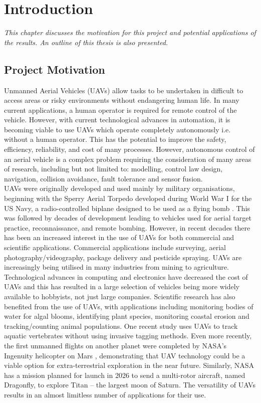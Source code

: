 
\chapter{Introduction}
\textit{This chapter discusses the motivation for this project and potential applications of the results. An outline of this thesis is also presented.}\\

\section{Project Motivation}
Unmanned Aerial Vehicles (UAVs) allow tasks to be undertaken in difficult to access areas or risky environments without endangering human life. In many current applications, a human operator is required for remote control of the vehicle. However, with current technological advances in automation, it is becoming viable to use UAVs which operate completely autonomously i.e. without a human operator. This has the potential to improve the safety, efficiency, reliability, and cost of many processes. However, autonomous control of an aerial vehicle is a complex problem requiring the consideration of many areas of research, including but not limited to: modelling, control law design, navigation, collision avoidance, fault tolerance and sensor fusion.\\

UAVs were originally developed and used mainly by military organisations, beginning with the Sperry Aerial Torpedo developed during World War I for the US Navy, a radio-controlled biplane designed to be used as a flying bomb \cite{Stoff2001}. This was followed by decades of development leading to vehicles used for aerial target practice, reconnaissance, and remote bombing. However, in recent decades there has been an increased interest in the use of UAVs for both commercial and scientific applications. Commercial applications include surveying, aerial photography/videography, package delivery and pesticide spraying. UAVs are increasingly being utilised in many industries from mining to agriculture. Technological advances in computing and electronics have decreased the cost of UAVs and this has resulted in a large selection of vehicles being more widely available to hobbyists, not just large companies. Scientific research has also benefited from the use of UAVs, with applications including monitoring bodies of water for algal blooms, identifying plant species, monitoring coastal erosion and tracking/counting animal populations. One recent study \cite{Raoult2018} uses UAVs to track aquatic vertebrates without using invasive tagging methods. Even more recently, the first unmanned flights on another planet were completed by NASA’s Ingenuity helicopter on Mars \cite{Johnson2021}, demonstrating that UAV technology could be a viable option for extra-terrestrial exploration in the near future. Similarly, NASA has a mission planned for launch in 2026 to send a multi-rotor aircraft, named Dragonfly, to explore Titan – the largest moon of Saturn\cite{Hautaluoma2019}.  The versatility of UAVs results in an almost limitless number of applications for their use.\\

